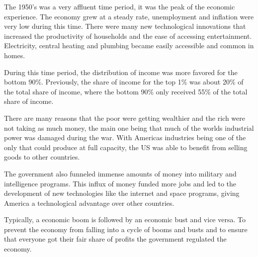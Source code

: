 The 1950's was a very affluent time period, it was the peak of the economic experience.
The economy grew at a steady rate, unemployment and inflation were very low during this time.
There were many new technological innovations that increased the productivity of households and the ease of accessing entertainment.
Electricity, central heating and plumbing became easily accessible and common in homes.

During this time period, the distribution of income was more favored for the bottom 90\%.
Previously, the share of income for the top 1\% was about 20\% of the total share of income, where the bottom 90\% only received 55\% of the total share of income.

There are many reasons that the poor were getting wealthier and the rich were not taking as much money, the main one being that much of the worlds industrial power was damaged during the war.
With Americas industries being one of the only that could produce at full capacity, the US was able to benefit from selling goods to other countries.

The government also funneled immense amounts of money into military and intelligence programs.
This influx of money funded more jobs and led to the development of new technologies like the internet and space programs, giving America a technological advantage over other countries.

Typically, a economic boom is followed by an economic bust and vice versa.
To prevent the economy from falling into a cycle of booms and busts and to ensure that everyone got their fair share of profits the government regulated the economy.